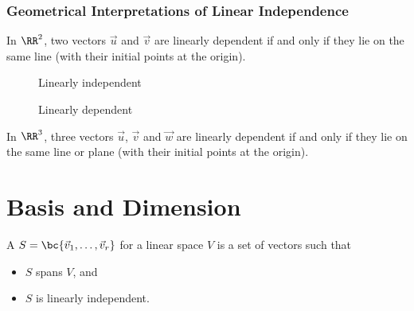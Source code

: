 \subsubsection{Geometrical Interpretations of Linear Independence}

In $\RR^2$, two vectors $\vec u$ and $\vec v$ are linearly dependent if and only if they lie on the same line (with their initial points at the origin).

\begin{minipage}{0.5 \textwidth}
    \begin{figure}[H]
    \centering
    \caption{Linearly independent}
    \end{figure}
\end{minipage}
\begin{minipage}{0.5 \textwidth}
    \begin{figure}[H]
    \centering
    \caption{Linearly dependent}
    \end{figure}
\end{minipage}
In $\RR^3$, three vectors $\vec u$, $\vec v$ and $\vec w$ are linearly dependent if and only if they lie on the same line or plane (with their initial points at the origin).

\section{Basis and Dimension}

\begin{definition}
    A  $S = \bc{\vec v_1, \dots, \vec v_r}$ for a linear space $V$ is a set of vectors such that
    \begin{itemize}
        \item $S$ spans $V$, and
        \item $S$ is linearly independent.
    \end{itemize}
\end{definition}

